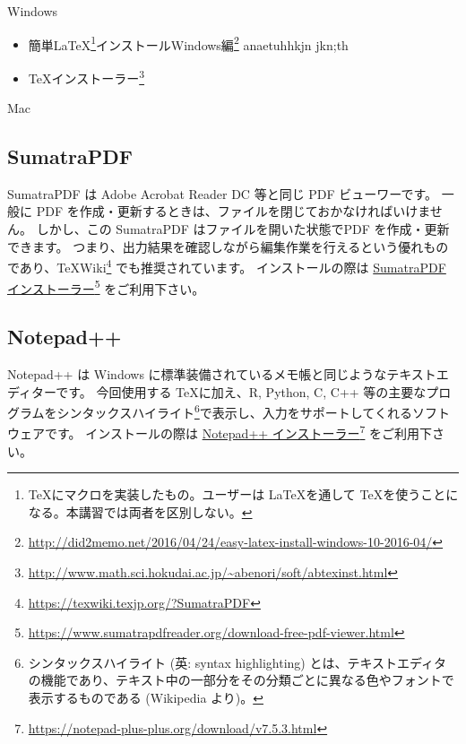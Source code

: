 \noindent Windows

\begin{itemize}
\item 簡単\LaTeX\footnote{\TeX にマクロを実装したもの。ユーザーは \LaTeX を通して \TeX を使うことになる。本講習では両者を区別しない。}インストールWindows編\footnote{\url{http://did2memo.net/2016/04/24/easy-latex-install-windows-10-2016-04/}}
  anaetuhhkjn
    jkn;th

\item \TeX インストーラー\footnote{\url{http://www.math.sci.hokudai.ac.jp/~abenori/soft/abtexinst.html}}
\end{itemize}



\noindent Mac




\subsection*{SumatraPDF}
SumatraPDF は Adobe Acrobat Reader DC 等と同じ PDF ビューワーです。
一般に PDF を作成・更新するときは、ファイルを閉じておかなければいけません。
しかし、この SumatraPDF はファイルを開いた状態でPDF を作成・更新できます。
つまり、出力結果を確認しながら編集作業を行えるという優れものであり、\TeX Wiki\footnote{\url{https://texwiki.texjp.org/?SumatraPDF}} でも推奨されています。
インストールの際は \href{https://www.sumatrapdfreader.org/download-free-pdf-viewer.html}{SumatraPDF インストーラー}\footnote{\url{https://www.sumatrapdfreader.org/download-free-pdf-viewer.html}} をご利用下さい。





\subsection*{Notepad++}
Notepad++ は Windows に標準装備されているメモ帳と同じようなテキストエディターです。
今回使用する \TeX に加え、R, Python, C, C++ 等の主要なプログラムをシンタックスハイライト\footnote{シンタックスハイライト (英: syntax highlighting) とは、テキストエディタの機能であり、テキスト中の一部分をその分類ごとに異なる色やフォントで表示するものである (Wikipedia より)。}で表示し、入力をサポートしてくれるソフトウェアです。
インストールの際は \href{https://notepad-plus-plus.org/download/v7.5.3.html}{Notepad++ インストーラー}\footnote{\url{https://notepad-plus-plus.org/download/v7.5.3.html}} をご利用下さい。






